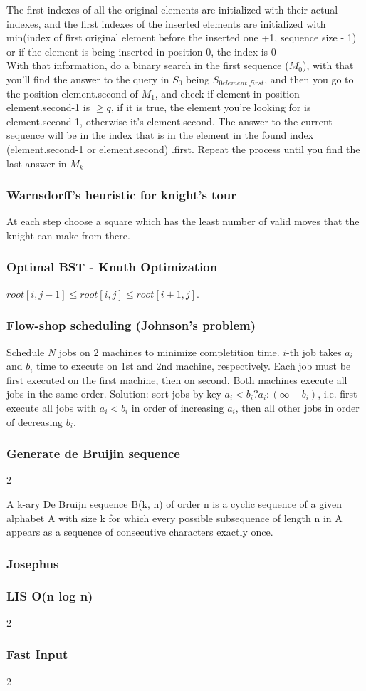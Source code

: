 \documentclass[a4paper,12pt]{article}
\newcommand\includefile[4]{
  \subsubsection{#2}
  \begin{multicols}{2}
    
  \end{multicols}
}
\begin{document}
    The first indexes of all the original elements are initialized with their actual indexes, and the first indexes of the inserted elements are initialized with min(index of first original element before the inserted one +1, sequence size - 1)
    or if the element is being inserted in position 0, the index is 0\\
    
With that information, do a binary search in the first sequence ($M_{0}$), with that you'll find the answer to the query in $S_{0}$ being $S_{0{element.first}}$, and then you go to the position element.second of $M_{1}$, and check if element in position element.second-1 is $\geq q$, if it is true, the element you're looking for is element.second-1, otherwise it's element.second. The answer to the current sequence will be in the index that is in the element in the found index (element.second-1 or element.second) .first. Repeat the process until you find the last answer in $M_{k}$

\subsubsection{Warnsdorff’s heuristic for knight’s tour}
At each step choose a square which has the least number of valid moves that the knight can make from there.

\subsubsection{Optimal BST - Knuth Optimization}
$root[i, j - 1] \leq root[i, j] \leq root[i + 1, j]$.

\subsubsection{Flow-shop scheduling (Johnson’s problem)}
Schedule $N$ jobs on 2 machines to minimize completition time. $i$-th job takes $a_i$ and $b_i$ time to execute on 1st and 2nd machine, respectively.
Each job must be first executed on the first machine, then on second. Both machines execute all jobs in the same order. Solution: sort jobs by key $a_i < b_i ? a_i : (\infty - b_i)$,
i.e. first execute all jobs with $a_i < b_i$ in order of increasing $a_i$, then all other jobs in order of decreasing $b_i$.

\includefile{c++}{Generate de Bruijin sequence}{misc}{debruijn.cpp}
A k-ary De Bruijn sequence B(k, n) of order n is a cyclic sequence of a given alphabet A with size k for which every possible subsequence of length n in A appears as a sequence of consecutive characters exactly once.

\subsubsection{Josephus}


\newpage

\includefile{c++}{LIS O(n log n)}{misc}{lis.cpp}

\includefile{c++}{Fast Input}{misc}{fast_input.cpp}
\end{document}
